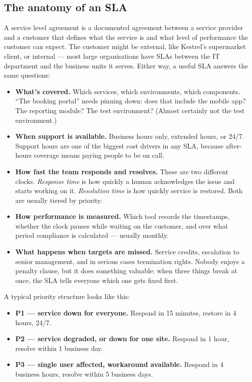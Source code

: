 \subsection{The anatomy of an SLA}


A service level agreement is a documented agreement between a service provider and a customer that defines what the service is and what level of performance the customer can expect. The customer might be external, like Kestrel's supermarket client, or internal — most large organisations have SLAs between the IT department and the business units it serves. Either way, a useful SLA answers the same questions:


\begin{itemize}[leftmargin=*]
\item \textbf{What's covered.} Which services, which environments, which components. ``The booking portal'' needs pinning down: does that include the mobile app? The reporting module? The test environment? (Almost certainly not the test environment.)
\item \textbf{When support is available.} Business hours only, extended hours, or 24/7. Support hours are one of the biggest cost drivers in any SLA, because after-hours coverage means paying people to be on call.
\item \textbf{How fast the team responds and resolves.} These are two different clocks. \emph{Response time} is how quickly a human acknowledges the issue and starts working on it. \emph{Resolution time} is how quickly service is restored. Both are usually tiered by priority.
\item \textbf{How performance is measured.} Which tool records the timestamps, whether the clock pauses while waiting on the customer, and over what period compliance is calculated — usually monthly.
\item \textbf{What happens when targets are missed.} Service credits, escalation to senior management, and in serious cases termination rights. Nobody enjoys a penalty clause, but it does something valuable: when three things break at once, the SLA tells everyone which one gets fixed first.
\end{itemize}

A typical priority structure looks like this:


\begin{itemize}[leftmargin=*]
\item \textbf{P1 — service down for everyone.} Respond in 15 minutes, restore in 4 hours, 24/7.
\item \textbf{P2 — service degraded, or down for one site.} Respond in 1 hour, resolve within 1 business day.
\item \textbf{P3 — single user affected, workaround available.} Respond in 4 business hours, resolve within 5 business days.
\end{itemize}

